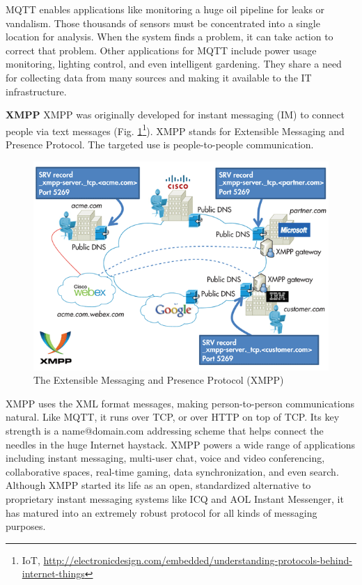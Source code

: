       MQTT enables applications like monitoring a huge oil pipeline for leaks or vandalism. Those thousands of sensors must be concentrated into a single location for analysis. When the system finds a problem, it can take action to correct that problem. Other applications for MQTT include power usage monitoring, lighting control, and even intelligent gardening. They share a need for collecting data from many sources and making it available to the IT infrastructure.

     \textbf{XMPP}
      \newline 
      XMPP was originally developed for instant messaging (IM) to connect people via text messages (Fig. \ref{img:XMPP}\footnote{IoT, \url{http://electronicdesign.com/embedded/understanding-protocols-behind-internet-things}}). XMPP stands for Extensible Messaging and Presence Protocol. The targeted use is people-to-people communication.
      \begin{figure}[!ht]
      \centering
      \includegraphics[scale=0.7]{images/XMPP.png}
      \caption[The Extensible Messaging and Presence Protocol (XMPP)]{The Extensible Messaging and Presence Protocol (XMPP)}
      \label{img:XMPP}                           
      \end{figure}

      XMPP uses the XML format messages, making person-to-person communications natural. Like MQTT, it runs over TCP, or over HTTP on top of TCP. Its key strength is a name@domain.com addressing scheme that helps connect the needles in the huge Internet haystack. XMPP powers a wide range of applications including instant messaging, multi-user chat, voice and video conferencing, collaborative spaces, real-time gaming, data synchronization, and even search. Although XMPP started its life as an open, standardized alternative to proprietary instant messaging systems like ICQ and AOL Instant Messenger, it has matured into an extremely robust protocol for all kinds of messaging purposes.

